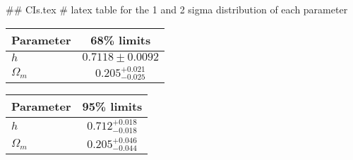 ## CIs.tex
# latex table for the 1 and 2 sigma distribution of each parameter

\begin{tabular} { l  c}
 Parameter &  68\% limits\\
\hline
{\boldmath$h              $} & $0.7118\pm 0.0092          $\\
{\boldmath$\Omega_m       $} & $0.205^{+0.021}_{-0.025}   $\\
\hline
\end{tabular}

\begin{tabular} { l  c}
 Parameter &  95\% limits\\
\hline
{\boldmath$h              $} & $0.712^{+0.018}_{-0.018}   $\\
{\boldmath$\Omega_m       $} & $0.205^{+0.046}_{-0.044}   $\\
\hline
\end{tabular}

